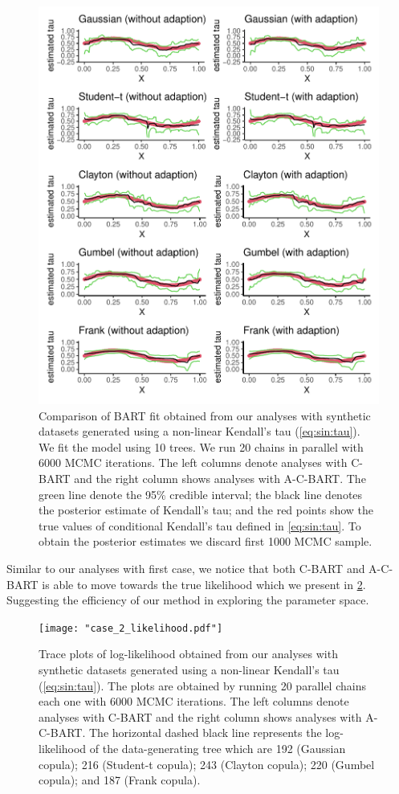 \documentclass{amsart}
\begin{document}
\begin{figure}
	\centering
	\includegraphics[width = 0.95\linewidth]{"case_2_pred.pdf"}
	\caption{Comparison of BART fit obtained from our analyses with synthetic datasets generated using a non-linear Kendall's tau (\cref{eq:sin:tau}). We fit the model using 10 trees. We run 20 chains in parallel with 6000 MCMC iterations. The left columns denote analyses with C-BART and the right column shows analyses with A-C-BART. The green line denote the 95\% credible interval; the black line denotes the posterior estimate of Kendall's tau; and the red points show the true values of conditional Kendall's tau defined in \cref{eq:sin:tau}. To obtain the posterior estimates we discard first 1000 MCMC sample.}
	\label{fig:trace:pred:ex2}
\end{figure}

Similar to our analyses with first case, we notice that both C-BART and A-C-BART is able to move towards the true likelihood which we present in \cref{fig:trace:like:ex2}. Suggesting the efficiency of our method in exploring the parameter space.

\begin{figure}
	\centering
	\texttt{[image: "case\_2\_likelihood.pdf"]}
	\caption{Trace plots of log-likelihood obtained from our analyses with synthetic datasets generated using a non-linear Kendall's tau (\cref{eq:sin:tau}). The plots are obtained by running 20 parallel chains each one with 6000 MCMC iterations. The left columns denote analyses with C-BART and the right column shows analyses with A-C-BART. The horizontal dashed black line represents the log-likelihood of the data-generating tree which are 192 (Gaussian copula); 216 (Student-t copula); 243 (Clayton copula); 220 (Gumbel copula); and 187 (Frank copula).}
	\label{fig:trace:like:ex2}
\end{figure}
\end{document}
